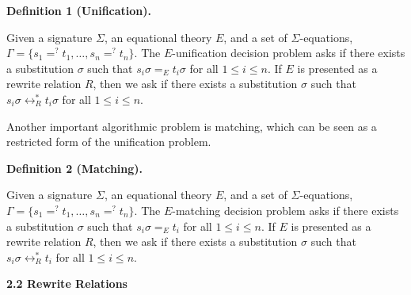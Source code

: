 \documentclass[10pt,a4paper]{amsart}
\begin{document}
 
 
\par\medskip\noindent\textbf{Definition 1 (Unification).}\par
 
 
Given a signature $\Sigma$, an equational theory $E$, and a set of $\Sigma$-equations, $\Gamma=\{s_{1}=^{?}t_{1},\dots,s_{n}=^{?}t_{n}\}$. The $E$-unification decision problem asks if there exists a substitution $\sigma$ such that $s_{i}\sigma=_{E}t_{i}\sigma$ for all $1\leq i\leq n$. If $E$ is presented as a rewrite relation $R$, then we ask if there exists a substitution $\sigma$ such that $s_{i}\sigma\leftrightarrow_{R}^{*}t_{i}\sigma$ for all $1\leq i\leq n$.\par
 
 
 
 
Another important algorithmic problem is matching, which can be seen as a restricted form of the unification problem.\par
 
 
 
\par\medskip\noindent\textbf{Definition 2 (Matching).}\par
 
 
Given a signature $\Sigma$, an equational theory $E$, and a set of $\Sigma$-equations, $\Gamma=\{s_{1}=^{?}t_{1},\dots,s_{n}=^{?}t_{n}\}$. The $E$-matching decision problem asks if there exists a substitution $\sigma$ such that $s_{i}\sigma=_{E}t_{i}$ for all $1\leq i\leq n$. If $E$ is presented as a rewrite relation $R$, then we ask if there exists a substitution $\sigma$ such that $s_{i}\sigma\leftrightarrow_{R}^{*}t_{i}$ for all $1\leq i\leq n$.\par
 
 
 
 
 
\par\medskip\noindent\textbf{2.2 Rewrite Relations}\par
 
\end{document}
